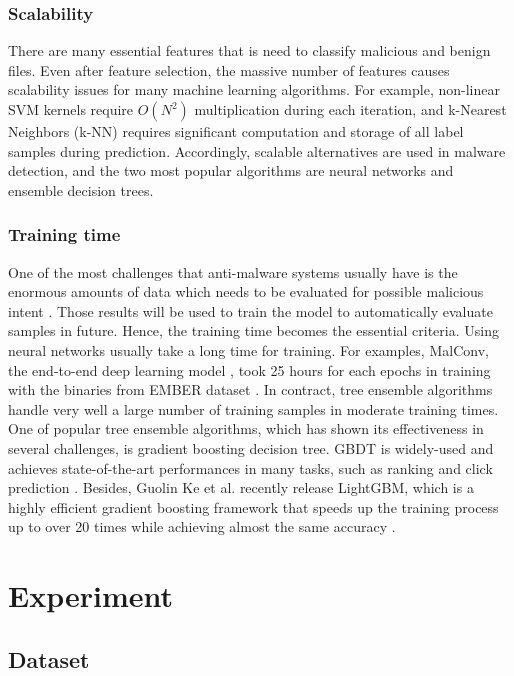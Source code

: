 \documentclass[runningheads]{llncs}
\begin{document}
\subsubsection{Scalability}

There are many essential features that is need to classify malicious and benign files. Even after feature selection, the massive number of features causes scalability issues for many machine learning algorithms. For example,  non-linear  SVM  kernels require $O(N^2)$ multiplication during each iteration, and k-Nearest Neighbors (k-NN) requires significant computation and storage of all label samples during prediction. Accordingly, scalable alternatives are used in malware detection, and the two most popular algorithms are neural networks and ensemble decision trees.

\subsubsection{Training time}

One of the most challenges that anti-malware systems usually have is the enormous amounts of data which needs to be evaluated for possible malicious intent \cite{ronen2018microsoft}. Those results will be used to train the model to automatically evaluate samples in future. Hence, the training time becomes the essential criteria. Using neural networks usually take a long time for training. For examples, MalConv, the end-to-end deep learning model \cite{raff2017malware}, took 25 hours for each epochs in training with the binaries from EMBER dataset \cite{anderson2018ember}. In contract, tree ensemble algorithms handle very well a large number of training samples in moderate training times. One of popular tree ensemble algorithms, which has shown its effectiveness in several challenges, is gradient boosting decision tree. GBDT is widely-used and achieves state-of-the-art performances in many tasks, such as ranking \cite{chris2010ranknet} and click prediction \cite{richardson2007predicting}. Besides, Guolin Ke et al. recently release LightGBM, which is a highly efficient gradient boosting framework that speeds up the training process up to over 20 times while achieving almost the same accuracy \cite{ke2017lightgbm}.

\section{Experiment}

\subsection{Dataset}
\end{document}
